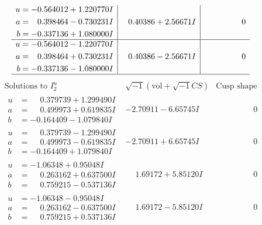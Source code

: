 \documentclass[1p]{elsarticle_modified}
\theoremstyle{definition}
\newcommand{\I}{\sqrt{-1}}
\begin{document}
$$\begin{array}{c|c|c}
\begin{aligned}
u &= -0.564012 + 1.220770 I \\
a &= \phantom{-}0.398464 - 0.730231 I \\
b &= -0.337136 + 1.080000 I\end{aligned}
 & \phantom{-}0.40386 + 2.56671 I & \phantom{-0.000000 } 0 \\ \hline\begin{aligned}
u &= -0.564012 - 1.220770 I \\
a &= \phantom{-}0.398464 + 0.730231 I \\
b &= -0.337136 - 1.080000 I\end{aligned}
 & \phantom{-}0.40386 - 2.56671 I & \phantom{-0.000000 } 0\\
 \hline 
 \end{array}$$\newpage$$\begin{array}{c|c|c}  
\text{Solutions to }I^u_{2}& \I (\text{vol} + \sqrt{-1}CS) & \text{Cusp shape}\\
 \hline 
\begin{aligned}
u &= \phantom{-}0.379739 + 1.299490 I \\
a &= \phantom{-}0.499973 + 0.619835 I \\
b &= -0.164409 - 1.079840 I\end{aligned}
 & -2.70911 - 6.65745 I & \phantom{-0.000000 } 0 \\ \hline\begin{aligned}
u &= \phantom{-}0.379739 - 1.299490 I \\
a &= \phantom{-}0.499973 - 0.619835 I \\
b &= -0.164409 + 1.079840 I\end{aligned}
 & -2.70911 + 6.65745 I & \phantom{-0.000000 } 0 \\ \hline\begin{aligned}
u &= -1.06348 + 0.95048 I \\
a &= \phantom{-}0.263162 + 0.637500 I \\
b &= \phantom{-}0.759215 - 0.537136 I\end{aligned}
 & \phantom{-}1.69172 + 5.85120 I & \phantom{-0.000000 } 0 \\ \hline\begin{aligned}
u &= -1.06348 - 0.95048 I \\
a &= \phantom{-}0.263162 - 0.637500 I \\
b &= \phantom{-}0.759215 + 0.537136 I\end{aligned}
 & \phantom{-}1.69172 - 5.85120 I & \phantom{-0.000000 } 0 \\ \hline\begin{aligned}

\end{aligned}
\end{array}$$
\end{document}
